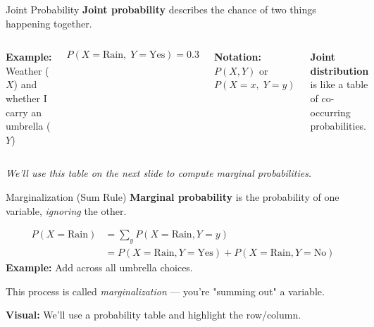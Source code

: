 \documentclass[handout,aspectratio=169]{beamer}
\begin{document}
\begin{frame}{Joint Probability}
	\textbf{Joint probability} describes the chance of two things happening together.
	
	\vspace{1em}
	\begin{columns}
		\textbf{Example:} Weather ($X$) and whether I carry an umbrella ($Y$)
		  
		\vspace{0.5em}
		\[
			P(X = \text{Rain},\; Y = \text{Yes}) = 0.3
		\]
		  
		\vspace{0.5em}
		\textbf{Notation:} $P(X, Y)$ or $P(X = x,\; Y = y)$
		
		\vspace{1em}
		\textbf{Joint distribution} is like a table of co-occurring probabilities.
		  
		\vspace{0.5em}
		  
		\includegraphics[width=\linewidth]{figs/joint_probability_diagram.png}
	\end{columns}
	  
	\textit{We'll use this table on the next slide to compute marginal probabilities.}
\end{frame}

\begin{frame}{Marginalization (Sum Rule)}
	\textbf{Marginal probability} is the probability of one variable, \textit{ignoring} the other.
	
	\vspace{1em}
	\begin{align*}
		P(X = \text{Rain}) & = \sum_y P(X = \text{Rain}, Y = y)                               \\
		                   & = P(X=\text{Rain}, Y=\text{Yes}) + P(X=\text{Rain}, Y=\text{No}) 
	\end{align*}
	\vspace{0.5em}
	\textbf{Example:} Add across all umbrella choices.
	
	\vspace{0.5em}
	This process is called \textit{marginalization} — you're "summing out" a variable.
	
	\vspace{1em}
	\textbf{Visual:} We'll use a probability table and highlight the row/column.
\end{frame}
\end{document}
